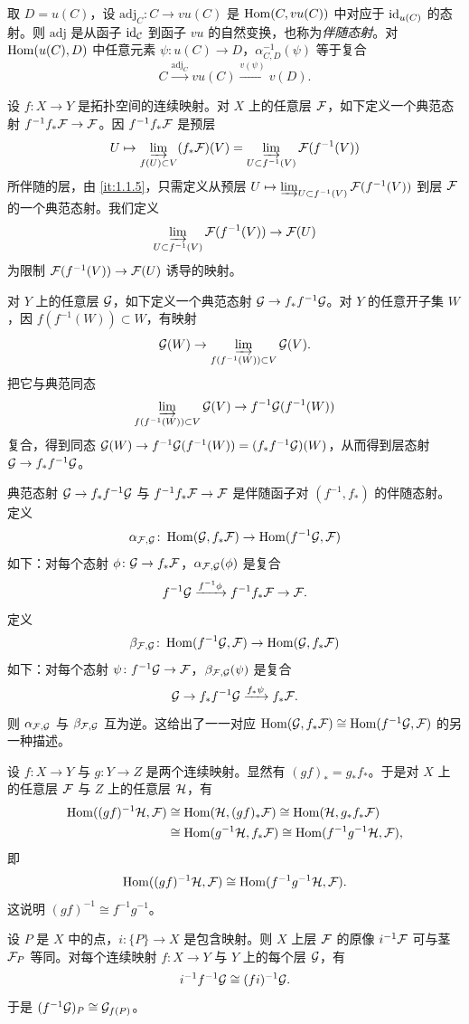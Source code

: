 取 $D=u(C)$，设 $\mathrm{adj}_C\colon C\to vu(C)$ 是 $\operatorname{Hom}(C,vu(C))$ 中对应于 $\operatorname{id}_{u(C)}$ 的态射。则 $\mathrm{adj}$ 是从函子 $\operatorname{id}_{\mathcal{C}}$ 到函子 $vu$ 的自然变换，也称为\emph{伴随态射}。对 $\operatorname{Hom}(u(C),D)$ 中任意元素 $\psi\colon u(C)\to D$，$\alpha^{-1}_{C,D}(\psi)$ 等于复合
\[
C\xrightarrow{\mathrm{adj}_C}vu(C)\xrightarrow{v(\psi)}v(D).
\]

设 $f\colon X\to Y$ 是拓扑空间的连续映射。对 $X$ 上的任意层 $\mathcal{F}$，如下定义一个典范态射 $f^{-1}f_*\mathcal{F}\to\mathcal{F}$。因 $f^{-1}f_*\mathcal{F}$ 是预层
\[
U\mapsto\varinjlim_{f(U)\subset V}(f_*\mathcal{F})(V)=\varinjlim_{U\subset f^{-1}(V)}\mathcal{F}(f^{-1}(V))
\]
所伴随的层，由 \ref{it:1.1.5}，只需定义从预层 $U\mapsto\varinjlim_{U\subset f^{-1}(V)}\mathcal{F}(f^{-1}(V))$ 到层 $\mathcal{F}$ 的一个典范态射。我们定义
\[
\varinjlim_{U\subset f^{-1}(V)}\mathcal{F}(f^{-1}(V))\to\mathcal{F}(U)
\]
为限制 $\mathcal{F}(f^{-1}(V))\to\mathcal{F}(U)$ 诱导的映射。

对 $Y$ 上的任意层 $\mathcal{G}$，如下定义一个典范态射 $\mathcal{G}\to f_*f^{-1}\mathcal{G}$。对 $Y$ 的任意开子集 $W$，因 $f(f^{-1}(W))\subset W$，有映射
\[
\mathcal{G}(W)\to\varinjlim_{f(f^{-1}(W))\subset V}\mathcal{G}(V).
\]
把它与典范同态
\[
\varinjlim_{f(f^{-1}(W))\subset V}\mathcal{G}(V)\to f^{-1}\mathcal{G}(f^{-1}(W))
\]
复合，得到同态 $\mathcal{G}(W)\to f^{-1}\mathcal{G}(f^{-1}(W))=(f_*f^{-1}\mathcal{G})(W)$，从而得到层态射 $\mathcal{G}\to f_*f^{-1}\mathcal{G}$。

典范态射 $\mathcal{G}\to f_*f^{-1}\mathcal{G}$ 与 $f^{-1}f_*\mathcal{F}\to\mathcal{F}$ 是伴随函子对 $(f^{-1},f_*)$ 的伴随态射。定义
\[
\alpha_{\mathcal{F},\mathcal{G}}\colon\operatorname{Hom}(\mathcal{G},f_*\mathcal{F})\to\operatorname{Hom}(f^{-1}\mathcal{G},\mathcal{F})
\]
如下：对每个态射 $\phi\colon\mathcal{G}\to f_*\mathcal{F}$，$\alpha_{\mathcal{F},\mathcal{G}}(\phi)$ 是复合
\[
f^{-1}\mathcal{G}\xrightarrow{f^{-1}\phi}f^{-1}f_*\mathcal{F}\to\mathcal{F}.
\]
定义
\[
\beta_{\mathcal{F},\mathcal{G}}\colon\operatorname{Hom}(f^{-1}\mathcal{G},\mathcal{F})\to\operatorname{Hom}(\mathcal{G},f_*\mathcal{F})
\]
如下：对每个态射 $\psi\colon f^{-1}\mathcal{G}\to\mathcal{F}$，$\beta_{\mathcal{F},\mathcal{G}}(\psi)$ 是复合
\[
\mathcal{G}\to f_*f^{-1}\mathcal{G}\xrightarrow{f_*\psi}f_*\mathcal{F}.
\]
则 $\alpha_{\mathcal{F},\mathcal{G}}$ 与 $\beta_{\mathcal{F},\mathcal{G}}$ 互为逆。这给出了一一对应 $\operatorname{Hom}(\mathcal{G},f_*\mathcal{F})\cong\operatorname{Hom}(f^{-1}\mathcal{G},\mathcal{F})$ 的另一种描述。

设 $f\colon X\to Y$ 与 $g\colon Y\to Z$ 是两个连续映射。显然有 $(gf)_*=g_*f_*$。于是对 $X$ 上的任意层 $\mathcal{F}$ 与 $Z$ 上的任意层 $\mathcal{H}$，有
\begin{align*}
\operatorname{Hom}((gf)^{-1}\mathcal{H},\mathcal{F})&\cong\operatorname{Hom}(\mathcal{H},(gf)_*\mathcal{F})\cong\operatorname{Hom}(\mathcal{H},g_*f_*\mathcal{F})\\
&\cong\operatorname{Hom}(g^{-1}\mathcal{H},f_*\mathcal{F})\cong\operatorname{Hom}(f^{-1}g^{-1}\mathcal{H},\mathcal{F}),
\end{align*}
即
\[
\operatorname{Hom}((gf)^{-1}\mathcal{H},\mathcal{F})\cong\operatorname{Hom}(f^{-1}g^{-1}\mathcal{H},\mathcal{F}).
\]
这说明 $(gf)^{-1}\cong f^{-1}g^{-1}$。

设 $P$ 是 $X$ 中的点，$i\colon\{P\}\to X$ 是包含映射。则 $X$ 上层 $\mathcal{F}$ 的原像 $i^{-1}\mathcal{F}$ 可与茎 $\mathcal{F}_P$ 等同。对每个连续映射 $f\colon X\to Y$ 与 $Y$ 上的每个层 $\mathcal{G}$，有
\[
i^{-1}f^{-1}\mathcal{G}\cong(fi)^{-1}\mathcal{G}.
\]
于是 $(f^{-1}\mathcal{G})_P\cong\mathcal{G}_{f(P)}$。

